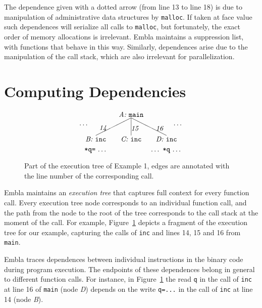 \documentclass[times, 10pt,twocolumn]{article}
\begin{document}
The dependence given with a dotted arrow 
(from line 13 to line 18) is due to manipulation of administrative 
data structures by {\tt malloc}. If taken at face value such dependences will
serialize all calls to {\tt malloc}, but fortunately, the exact order
of memory allocations is irrelevant. Embla maintains a suppression list,
with functions that behave 
in this way.  Similarly, dependences arise due to the
manipulation of the call stack, which are also irrelevant for parallelization.



\section{Computing Dependencies}   \label{snca}

\begin{figure} \small
\hrulefill
\[
\begin{picture}(160,60)(70,15)
\put(120,65){\makebox(60,10)[c]{\it A:\ \tt main}}
\put(150,65){\line(-2,-1){50}}
\put(150,65){\line( 0,-1){25}}
\put(150,65){\line( 2,-1){50}}
\put(95,45){\makebox(20,10)[r]{\it 14}}
\put(150,45){\makebox(20,10)[l]{\it 15}}
\put(185,45){\makebox(20,10)[l]{\it 16}}
\put(70,50){\makebox(20,10)[r]{\ldots}}
\put(210,50){\makebox(20,10)[l]{\ldots}}
\put(170,30){\makebox(60,10)[c]{\it D:\ \tt inc}}
\put(120,30){\makebox(60,10)[c]{\it C:\ \tt inc}}
\put(70,30){\makebox(60,10)[c]{\it B:\ \tt inc}}
\put(70,15){\makebox(60,10)[cb]{{\tt *q=}\ \ldots}}
\put(170,15){\makebox(60,10)[cb]{\ldots\ {\tt *q}\ \ldots}}
\end{picture}
\]
\hrulefill
\caption{Part of the execution tree of Example 1, edges are annotated 
with the line number of the corresponding call.} 
\label{ffextree}
\end{figure}

Embla maintains an {\em execution tree} that captures full context for
every function call. Every execution tree node corresponds to an
individual function call, and the path from the node to the root of the
tree corresponds to the call stack at the moment of the call. For
example, Figure~\ref{ffextree} depicts a fragment of the execution tree
for our example, capturing the calls of {\tt inc} and lines 14, 15 and
16 from {\tt main}.

Embla traces dependences between individual instructions in the binary
code during program execution. The endpoints of these dependences belong
in general to different function calls. For instance, in
Figure~\ref{ffextree} the read {\tt *q} in the call of {\tt inc} at line 16
of {\tt main} (node {\it D}) depends on the write {\tt *q=...} in the call
of {\tt inc} at line 14 (node {\it B}).
\end{document}
